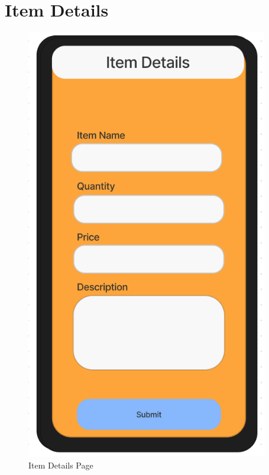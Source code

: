 \documentclass[title page]{article}
\begin{document}
\section{Item Details}
\begin{figure}[!h]
    \begin{center}
          \includegraphics[height=19cm]{item.png}
          \caption{Item Details Page}
          \label{fig:itemdetails}
    \end{center}
\end{figure}
\end{document}
